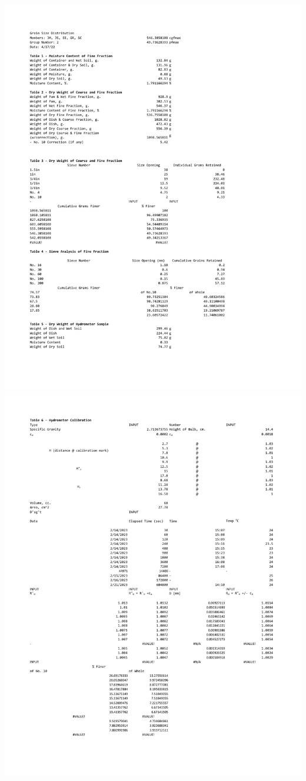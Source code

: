 \documentclass{article}
\begin{document}
\begin{center}
\includegraphics*[scale=0.8]{ds2.pdf}
\includegraphics*[scale=0.8]{ds2_2.pdf}

\end{center}
\end{document}
